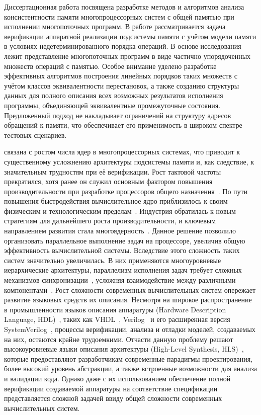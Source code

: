Диссертационная работа посвящена разработке методов и алгоритмов
анализа консистентности памяти многопроцессорных систем с общей
памятью при исполнении многопоточных программ. В работе
рассматривается задача верификации аппаратной реализации
подсистемы памяти с учётом модели памяти в условиях
недетерминированного порядка операций.
В основе исследования лежит представление многопоточных программ в
виде частично упорядоченных множеств операций с памятью. Особое
внимание уделено разработке эффективных алгоритмов построения
линейных порядков таких множеств с учётом классов эквивалентности
перестановок, а также созданию структуры данных для полного описания
всех возможных результатов исполнения программы, объединяющей
эквивалентные промежуточные состояния.
Предложенный подход не накладывает ограничений на структуру адресов
обращений к памяти,
что обеспечивает его применимость в широком спектре тестовых сценариев.

{\actuality} связана с ростом числа ядер в многопроцессорных
системах, что приводит к существенному усложнению архитектуры
подсистемы памяти и, как следствие, к значительным трудностям при её
верификации.
Рост тактовой частоты прекратился, хотя ранее он служил основным
фактором повышения производительности при разработке процессоров
общего назначения~\cite{cpu,trend}.
По пути повышения быстродействия вычислительное ядро приблизилось к
своим физическим и технологическим пределам~\cite{physLimits}.
Индустрия обратилась к новым стратегиям для дальнейшего роста
производительности, и ключевым направлением развития стала
многоядерность~\cite{multithreaded}.
Данное решение позволило организовать параллельное выполнение задач
на процессоре,
увеличив общую эффективность вычислительной системы.
Вследствие этого сложность таких систем значительно увеличилась.
В них применяются многоуровневые иерархические архитектуры,
параллелизм исполнения задач требует сложных механизмов
синхронизации~\cite{sync},
усложняя взаимодействие между различными компонентами~\cite{hieracy}.
Рост сложности современных вычислительных систем опережает развитие
языковых средств их описания.
Несмотря на широкое распространение в промышленности языков описания
аппаратуры (Hardware Description Language,
HDL)~\cite{mermet2012fundamentals}, таких как VHDL~\cite{vhdl},
Verilog~\cite{verilog}
и его расширенная версия
SystemVerilog~\cite{systemvetilog}, процессы верификации, анализа и
отладки моделей, создаваемых на них, остаются крайне трудоемкими.
Отчасти данную проблему решают высокоуровневые языки описания
архитектуры (High-Level Synthesis, HLS)~\cite{hls}, которые предоставляют
разработчикам современные парадигмы проектирования, более высокий
уровень абстракции, а также встроенные возможности для анализа и валидации кода.
Однако даже с их использованием обеспечение полной верификации
создаваемой аппаратуры на соответствие спецификации представляется
сложной задачей ввиду общей сложности
современных вычислительных систем.

